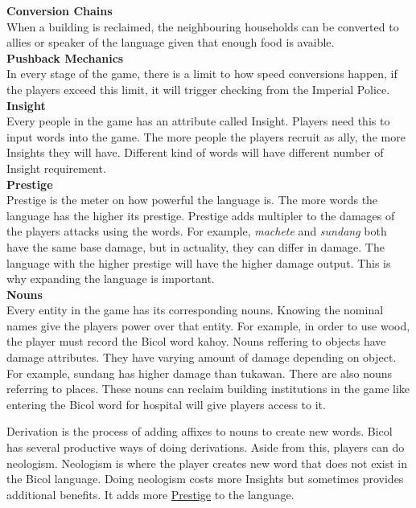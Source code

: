 \documentclass[11pt]{article}
\begin{document}
\textbf{Conversion Chains}\\
When a building is reclaimed, the neighbouring households can be converted to allies or speaker of the language given that enough food is avaible.\\

\textbf{Pushback Mechanics}\\
In every stage of the game, there is a limit to how speed conversions happen, if the players exceed this limit, it will trigger checking from the Imperial Police.\\

\textbf{Insight}\\
Every people in the game has an attribute called Insight. Players need this to input words into the game. The more people the players recruit as ally, the more Insights they will have. Different kind of words will have different number of Insight requirement.\\

\hypertarget{prestige}{\textbf{Prestige}}\\
Prestige  is the meter on how powerful the language is. The more words the language has the higher its prestige. Prestige adds multipler to the damages of the players attacks using the words. For example, \textit{machete} and \textit{sundang} both have the same base damage, but in actuality, they can differ in damage. The language with the higher prestige will have the higher damage output. This is why expanding the language is important.\\

\textbf{Nouns}\\
Every entity in the game has its corresponding nouns. Knowing the nominal names give the players power over that entity. For example, in order to use wood, the player must record the Bicol word kahoy. Nouns reffering to objects have damage attributes. They have varying amount of damage depending on object. For example, sundang has higher damage than tukawan.
There are also nouns referring to places. These nouns can reclaim building institutions in the game like entering the Bicol word for hospital will give players access to it.

Derivation is the process of adding affixes to nouns to create new words. Bicol has several productive ways of doing derivations. Aside from this, players can do neologism. Neologism is where the player creates new word that does not exist in the Bicol language. Doing neologism costs more Insights but sometimes provides additional benefits. It adds more \hyperlink{prestige}{Prestige} to the language.
\end{document}
